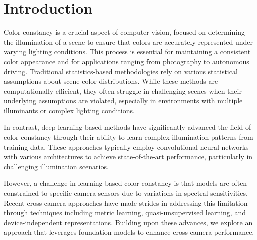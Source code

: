 \section{Introduction}
\label{sec:intro}

Color constancy is a crucial aspect of computer vision, focused on determining the illumination of a scene to ensure that colors are accurately represented under varying lighting conditions. This process is essential for maintaining a consistent color appearance and for applications ranging from photography to autonomous driving. Traditional statistics-based methodologies \cite{buchsbaum1980spatial, land1977retinex, forsyth1990novel, van2007edge, joze2012role, qian2019finding, barnard2002comparison, finlayson2004shades} rely on various statistical assumptions about scene color distributions. While these methods are computationally efficient, they often struggle in challenging scenes when their underlying assumptions are violated, especially in environments with multiple illuminants or complex lighting conditions.

In contrast, deep learning-based methods \cite{hu2017fc4, Bianco2015ColorCU, Lou2015ColorCB} have significantly advanced the field of color constancy through their ability to learn complex illumination patterns from training data. These approaches typically employ convolutional neural networks with various architectures to achieve state-of-the-art performance, particularly in challenging illumination scenarios.

However, a challenge in learning-based color constancy is that models are often constrained to specific camera sensors due to variations in spectral sensitivities. Recent cross-camera approaches \cite{igtn, bianco2019quasi, afifi2019sensor, afifi2021cross, lo2021clcc, yu2020cascading} have made strides in addressing this limitation through techniques including metric learning, quasi-unsupervised learning, and device-independent representations. Building upon these advances, we explore an approach that leverages foundation models to enhance cross-camera performance.


